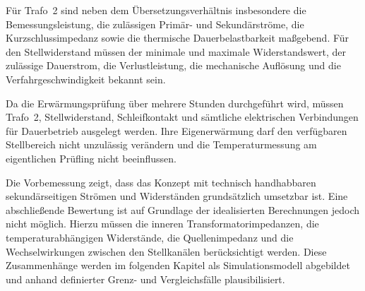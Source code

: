 Für Trafo~2 sind neben dem Übersetzungsverhältnis insbesondere die
Bemessungsleistung, die zulässigen Primär- und Sekundärströme, die
Kurzschlussimpedanz sowie die thermische Dauerbelastbarkeit
maßgebend. Für den Stellwiderstand müssen der minimale und maximale
Widerstandswert, der zulässige Dauerstrom, die Verlustleistung, die
mechanische Auflösung und die Verfahrgeschwindigkeit bekannt sein.

Da die Erwärmungsprüfung über mehrere Stunden durchgeführt wird,
müssen Trafo~2, Stellwiderstand, Schleifkontakt und sämtliche
elektrischen Verbindungen für Dauerbetrieb ausgelegt werden. Ihre
Eigenerwärmung darf den verfügbaren Stellbereich nicht unzulässig
verändern und die Temperaturmessung am eigentlichen Prüfling nicht
beeinflussen.

Die Vorbemessung zeigt, dass das Konzept mit technisch handhabbaren
sekundärseitigen Strömen und Widerständen grundsätzlich umsetzbar ist.
Eine abschließende Bewertung ist auf Grundlage der idealisierten
Berechnungen jedoch nicht möglich. Hierzu müssen die inneren
Transformatorimpedanzen, die temperaturabhängigen Widerstände, die
Quellenimpedanz und die Wechselwirkungen zwischen den Stellkanälen
berücksichtigt werden. Diese Zusammenhänge werden im folgenden
Kapitel als Simulationsmodell abgebildet und anhand definierter
Grenz- und Vergleichsfälle plausibilisiert.
